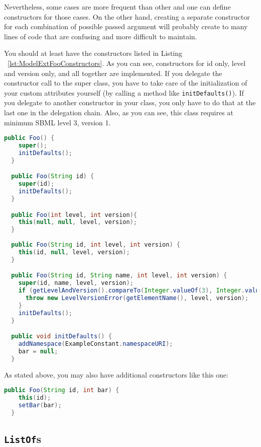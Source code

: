 Nevertheless, some cases are more frequent than other and one can define constructors for those cases.
On the other hand, creating a separate constructor for each combination of possible passed argument will probably create to many lines of code
that are confusing and more difficult to maintain.

You should at least have the constructors listed in Listing ~\vref{lst:ModelExtFooConstructors}.
As you can see, constructors for id only, level and version only, and all together are implemented.
If you delegate the constructor call to the super class, you have to take care of the initialization of your custom attributes yourself (by calling a method like \texttt{initDefaults()}).
If you delegate to another constructor in your class, you only have to do that at the last one in the delegation chain.
Also, as you can see, this class requires at minimum SBML level 3, version 1.

\begin{lstlisting}[language=Java,caption={Constructors for \texttt{Foo}},label=lst:ModelExtFooConstructors]
  public Foo() {
    super();
    initDefaults();
  }

  public Foo(String id) {
    super(id);
    initDefaults();
  }

  public Foo(int level, int version){
    this(null, null, level, version);
  }
 
  public Foo(String id, int level, int version) {
    this(id, null, level, version);
  }

  public Foo(String id, String name, int level, int version) {
    super(id, name, level, version);
    if (getLevelAndVersion().compareTo(Integer.valueOf(3), Integer.valueOf(1)) < 0) {
      throw new LevelVersionError(getElementName(), level, version);
    }
    initDefaults();
  }

  public void initDefaults() {
    addNamespace(ExampleConstant.namespaceURI);
    bar = null;   
  }
\end{lstlisting}

As stated above, you may also have additional constructors like this one:

\begin{lstlisting}[language=Java,float,caption={Additional constructors for \texttt{Foo}},label=lst:ModelExtFooConstructorsAdditional]
  public Foo(String id, int bar) {
    this(id);
    setBar(bar);
  }
\end{lstlisting}



\subsection{\texttt{ListOf}s}


